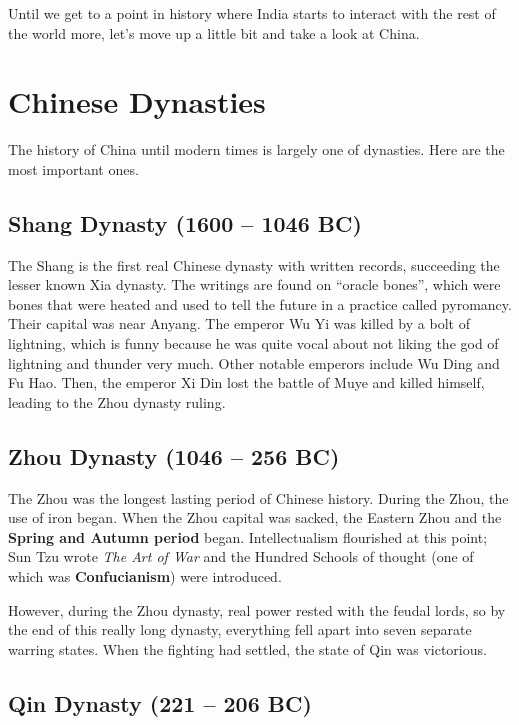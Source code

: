 Until we get to a point in history where India starts to interact with the rest of the world more,
let's move up a little bit and take a look at China.

\section{Chinese Dynasties}

The history of China until modern times is largely one of dynasties.
Here are the most important ones.

\subsection*{Shang Dynasty (1600 -- 1046 BC)}

The Shang is the first real Chinese dynasty with written records, succeeding the lesser known Xia dynasty.
The writings are found on ``oracle bones'',
which were bones that were heated and used to tell the future in a practice called pyromancy.
Their capital was near Anyang.
The emperor Wu Yi was killed by a bolt of lightning,
which is funny because he was quite vocal about not liking the god of lightning and thunder very much.
Other notable emperors include Wu Ding and Fu Hao.
Then, the emperor Xi Din lost the battle of Muye and killed himself, leading to the Zhou dynasty ruling.

\subsection*{Zhou Dynasty (1046 -- 256 BC)}

The Zhou was the longest lasting period of Chinese history.
During the Zhou, the use of iron began.
When the Zhou capital was sacked, the Eastern Zhou and the \textbf{Spring and Autumn period} began.
Intellectualism flourished at this point;
Sun Tzu wrote \textit{The Art of War}
and the Hundred Schools of thought (one of which was \textbf{Confucianism}) were introduced.

However, during the Zhou dynasty, real power rested with the feudal lords, so
by the end of this really long dynasty,
everything fell apart into seven separate warring states.
When the fighting had settled, the state of Qin was victorious.

\subsection*{Qin Dynasty (221 -- 206 BC)}

